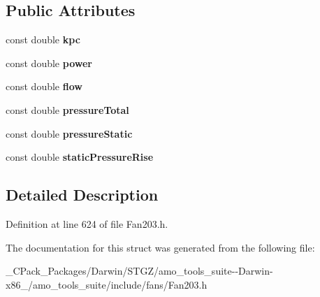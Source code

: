 \subsection*{Public Attributes}
\begin{DoxyCompactItemize}
\item 
\mbox{\label{struct_fan203_1_1_results_af7807d80fca26d0b285bc64724955bef}} 
const double {\bfseries kpc}
\item 
\mbox{\label{struct_fan203_1_1_results_a9349844e20eff206f02af8966e2e5fac}} 
const double {\bfseries power}
\item 
\mbox{\label{struct_fan203_1_1_results_ac33d08fec0aca62c54453533afd56138}} 
const double {\bfseries flow}
\item 
\mbox{\label{struct_fan203_1_1_results_a1badf6a2ca70b8a8e5b5a8434bd616cd}} 
const double {\bfseries pressure\+Total}
\item 
\mbox{\label{struct_fan203_1_1_results_aafd803a2134247f32b4da2f6c456e003}} 
const double {\bfseries pressure\+Static}
\item 
\mbox{\label{struct_fan203_1_1_results_a78f134ec5411707138395bfd17e2f34e}} 
const double {\bfseries static\+Pressure\+Rise}
\end{DoxyCompactItemize}


\subsection{Detailed Description}


Definition at line 624 of file Fan203.\+h.



The documentation for this struct was generated from the following file\+:\begin{DoxyCompactItemize}
\item 
\+\_\+\+C\+Pack\+\_\+\+Packages/\+Darwin/\+S\+T\+G\+Z/amo\+\_\+tools\+\_\+suite-\/-\/\+Darwin-\/x86\+\_/amo\+\_\+tools\+\_\+suite/include/fans/Fan203.\+h\end{DoxyCompactItemize}

